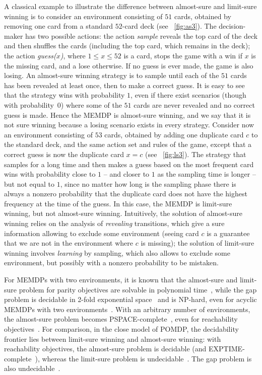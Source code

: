 \documentclass[a4paper,USenglish,cleveref, autoref, thm-restate]{lipics-v2021}
\begin{document}
A classical example to illustrate the difference between almost-sure and limit-sure 
winning is to consider an environment consisting of $51$ cards, obtained by removing 
one card from a standard $52$-card deck (see \figurename~\ref{fig:as3}). The decision-maker has two possible
actions: the action \emph{sample} reveals the top card of the deck and then 
shuffles the cards (including the top card, which remains in the deck);
the action \emph{guess($x$)}, where $1 \leq x \leq 52$ is a card, 
stops the game with a win if $x$ is the missing card, and a lose otherwise. 
If no guess is ever made, the game is also losing.
An almost-sure winning strategy is to sample until each of the $51$ cards has been 
revealed at least once, then to make a correct guess. It is easy to see that
the strategy wins with probability $1$, even if there exist scenarios (though with probability~$0$)
where some of the $51$ cards are never revealed and no correct guess is made.
Hence the MEMDP is almost-sure winning, and we say that it is not sure winning
because a losing scenario exists in every strategy.
Consider now an environment consisting of $53$ cards, obtained by adding
one duplicate card $c$ to the standard deck, and the same action set and rules of the game,
except that a correct guess is now the duplicate card $x = c$ (see \figurename~\ref{fig:ls3}).
The strategy that samples for a long time and then makes a guess based on the 
most frequent card wins with probability close to $1$ -- and closer to $1$
as the sampling time is longer -- but not equal to $1$, since no matter how long is the sampling phase
there is always a nonzero probability that the duplicate card does not have the highest frequency
at the time of the guess. In this case, the MEMDP is limit-sure winning, but not almost-sure winning.
Intuitively, the solution of almost-sure winning relies on the analysis of
\emph{revealing} transitions, which give a sure information allowing to exclude 
some environment (seeing card $c$ is a guarantee that we are not in the environment
where $c$ is missing); the solution of limit-sure winning involves \emph{learning} 
by sampling, which also allows to exclude some environment, but possibly with a 
nonzero probability to be mistaken. 

For MEMDPs with two environments, it is known 
that the almost-sure and limit-sure problem for parity objectives are solvable in 
polynomial time~\cite[Theorem~33, Theorem~40]{RS14}, while the gap problem is decidable in 2-fold exponential 
space~\cite[Theorem~30]{RS14} and is NP-hard, even for acyclic MEMDPs with two environments~\cite[Theorem~26]{RS14}. 
With an arbitrary number of environments,
the almost-sure problem becomes PSPACE-complete~\cite[Theorem~41]{SVJ24}, even for reachability objectives~\cite[Lemma~11]{vdVJJ23}.  
 For comparison, in the close model of POMDP, the decidability frontier lies between limit-sure winning and almost-sure winning: with reachability objectives, the almost-sure problem is decidable (and EXPTIME-complete~\cite{BGB12}), whereas the limit-sure problem is undecidable~\cite{GO10}. The gap problem is also undecidable~\cite{MHC03}. 
\end{document}
